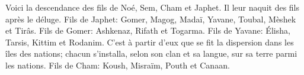Voici la descendance des fils de Noé, Sem, Cham et Japhet.
	Il leur naquit des fils après le déluge.
Fils de Japhet: Gomer, Magog, Madaï, Yavane, Toubal, Mèshek et Tirâs.
Fils de Gomer: Ashkenaz, Rifath et Togarma.
Fils de Yavane: Élisha, Tarsis, Kittim et Rodanim.
C’est à partir d’eux que se fit la dispersion dans les îles des nations;
	chacun s’installa, selon son clan et sa langue, sur sa terre parmi les nations.
Fils de Cham: Koush, Misraïm, Pouth et Canaan.
